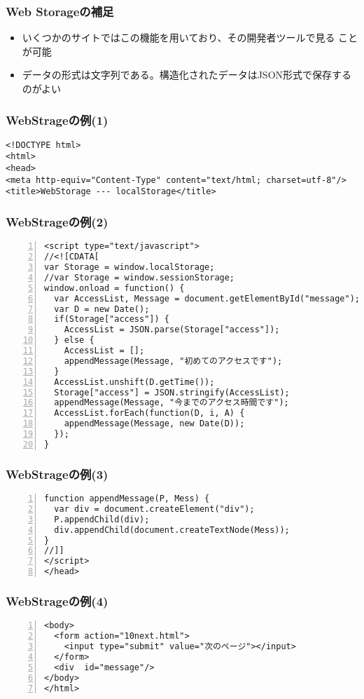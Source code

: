  \begin{frame}[containsverbatim]
 \frametitle{Web Storageの補足}
 \begin{itemize}
 \item いくつかのサイトではこの機能を用いており、その開発者ツールで見る
       ことが可能
 \item データの形式は文字列である。構造化されたデータはJSON形式で保存するのがよい
 \end{itemize}
 \end{frame}
\begin{frame}[containsverbatim]
 \frametitle{WebStrageの例(1)}
 \begin{Verbatim}[fontsize=\small]
<!DOCTYPE html>
<html>
<head>
<meta http-equiv="Content-Type" content="text/html; charset=utf-8"/>
<title>WebStorage --- localStorage</title>
\end{Verbatim}
 \end{frame}
\begin{frame}[containsverbatim]
 \frametitle{WebStrageの例(2)}
  \begin{Verbatim}[numbers=left, fontsize=\scriptsize]
<script type="text/javascript">
//<![CDATA[
var Storage = window.localStorage;
//var Storage = window.sessionStorage;
window.onload = function() {
  var AccessList, Message = document.getElementById("message");
  var D = new Date();
  if(Storage["access"]) {
    AccessList = JSON.parse(Storage["access"]);
  } else {
    AccessList = [];
    appendMessage(Message, "初めてのアクセスです");
  }
  AccessList.unshift(D.getTime());
  Storage["access"] = JSON.stringify(AccessList);
  appendMessage(Message, "今までのアクセス時間です");
  AccessList.forEach(function(D, i, A) {
    appendMessage(Message, new Date(D));
  });
}
\end{Verbatim}
 \end{frame}
\begin{frame}[containsverbatim]
 \frametitle{WebStrageの例(3)}
  \begin{Verbatim}[numbers=left, fontsize=\small]
function appendMessage(P, Mess) {
  var div = document.createElement("div");
  P.appendChild(div);
  div.appendChild(document.createTextNode(Mess));
}
//]]
</script>
</head>
 \end{Verbatim}
\end{frame}
\begin{frame}[containsverbatim]
 \frametitle{WebStrageの例(4)}
  \begin{Verbatim}[numbers=left, fontsize=\small]
<body>
  <form action="10next.html">
    <input type="submit" value="次のページ"></input>
  </form>
  <div  id="message"/>
</body>
</html>
\end{Verbatim}
\end{frame}

